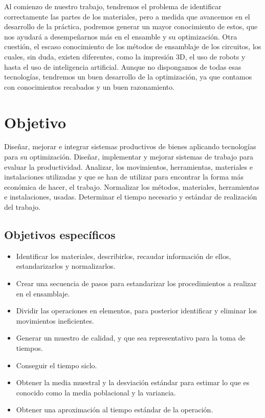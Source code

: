     Al comienzo de nuestro trabajo, tendremos el problema de identificar correctamente las partes de los materiales, pero a medida que avancemos en el desarrollo de la práctica, podremos generar un mayor conocimiento de estos, que nos ayudará a desempeñarnos más en el ensamble y su optimización.
    Otra cuestión, el escaso conocimiento de los métodos de ensamblaje de los circuitos, los cuales, sin duda, existen diferentes, como la impresión 3D, el uso de robots y hasta el uso de inteligencia artificial. Aunque no dispongamos de todas esas tecnologías, tendremos un buen desarrollo de la optimización, ya que contamos con conocimientos recabados y un buen razonamiento.
    
    
    \section{Objetivo}
    
    Diseñar, mejorar e integrar sistemas productivos de bienes aplicando tecnologías para su optimización. Diseñar, implementar y mejorar sistemas de trabajo para evaluar la productividad. Analizar, los movimientos, herramientas, materiales e instalaciones utilizadas y que se han de utilizar para encontrar la forma más económica de hacer, el trabajo. Normalizar los métodos, materiales, herramientas e instalaciones, usadas. Determinar el tiempo necesario y estándar de realización del trabajo.
    
    
    \subsection{Objetivos específicos}
    
    \begin{itemize}
        \item Identificar los materiales, describirlos, recaudar información de ellos, estandarizarlos y normalizarlos.
        \item Crear una secuencia de pasos para estandarizar los procedimientos a realizar en el ensamblaje.
        \item Dividir las operaciones en elementos, para posterior identificar y eliminar los movimientos ineficientes.
        \item Generar un muestro de calidad, y que sea representativo para la toma de tiempos.
        \item Conseguir el tiempo siclo.
        \item Obtener la media muestral y la desviación estándar para estimar lo que es conocido como la media poblacional y la variancia.
        \item Obtener una aproximación al tiempo estándar de la operación.
        
    \end{itemize}
    
